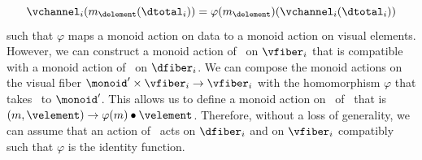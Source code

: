 \documentclass[../main.tex]{subfiles}
\begin{document}
\begin{equation}
\vchannel_i(m_{\delement}(\dtotal_i)) = \varphi(m_{\delement})(\vchannel_i(\dtotal_i))
\label{eq:math:artist:nu:equivariance}
\end{equation} 
such that $\varphi$ maps a monoid action on data to a monoid action on visual elements. However, we can construct a monoid action of \monoid\ on $\vfiber_{i}$ that is compatible with a monoid action of \monoid\ on $\dfiber_{i}$. We can compose the monoid actions on the visual fiber $\monoid^{\prime} \times \vfiber_{i} \rightarrow \vfiber_{i}$ with the homomorphism $\varphi$ that takes \monoid\ to $\monoid^{\prime}$. This allows us to define a monoid action on \vfiber\ of \monoid\ that is $(m, \velement) \rightarrow \varphi(m)\bullet\velement$. Therefore, without a loss of generality, we can assume that an action of \monoid\ acts on $\dfiber_{i}$ and on $\vfiber_{i}$ compatibly such that $\varphi$ is the identity function. 
\end{document}
